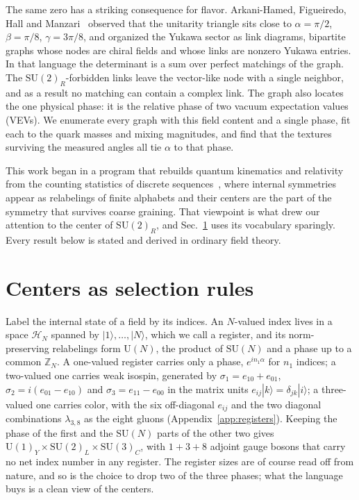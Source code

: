\documentclass[submission, Phys]{SciPost}
\newcommand{\SU}{\mathrm{SU}}
\newcommand{\U}{\mathrm{U}}
\newcommand{\Z}{\mathbb{Z}}
\newcommand{\ket}[1]{|#1\rangle}
\begin{document}
The same zero has a striking consequence for flavor. Arkani-Hamed,
Figueiredo, Hall and Manzari~\cite{Arkani-Hamed:2026uos} observed that
the unitarity triangle sits close to $\alpha=\pi/2$, $\beta=\pi/8$,
$\gamma=3\pi/8$, and organized the Yukawa
sector as link diagrams, bipartite graphs whose nodes are chiral fields
and whose links are nonzero Yukawa entries. In that language the
determinant is a sum over perfect matchings of the graph. The
$\SU(2)_R$-forbidden links leave the vector-like node with a single
neighbor, and as a result no matching can contain a complex link. The
graph also locates the one physical phase: it is the relative phase of
two vacuum expectation values (VEVs). We enumerate every graph with
this field content and a single phase, fit each to the quark masses and
mixing magnitudes, and find that the textures surviving the measured
angles all tie $\alpha$ to that phase.

This work began in a program that rebuilds quantum kinematics and
relativity from the counting statistics of discrete
sequences~\cite{Powers:2021rfg,Powers:2023ydg,PowersThesis2023,Powers:2023sqf,Berglund:2022kew,QHO,Powers:2026gbt},
where internal symmetries appear as relabelings of finite alphabets and
their centers are the part of the symmetry that survives coarse
graining. That viewpoint is what drew our attention to the center of
$\SU(2)_R$, and Sec.~\ref{sec:prelim} uses its vocabulary sparingly.
Every result below is stated and derived in ordinary field theory.

\section{Centers as selection rules}
\label{sec:prelim}

Label the internal state of a field by its indices. An $N$-valued index
lives in a space $\mathcal H_N$ spanned by $\ket1,\dots,\ket N$, which we
call a register, and its norm-preserving relabelings form $\U(N)$, the
product of $\SU(N)$ and a phase up to a common $\Z_N$. A one-valued register carries
only a phase, $e^{in_1\alpha}$ for $n_1$ indices; a two-valued one
carries weak isospin, generated by $\sigma_1=e_{10}+e_{01}$,
$\sigma_2=i(e_{01}-e_{10})$ and $\sigma_3=e_{11}-e_{00}$ in the matrix
units $e_{ij}\ket k=\delta_{jk}\ket i$; a three-valued one carries
color, with the six off-diagonal $e_{ij}$ and the two diagonal
combinations $\lambda_{3,8}$ as the eight gluons
(Appendix~\ref{app:registers}). Keeping the phase of the first and the
$\SU(N)$ parts of the other two gives
$\U(1)_Y\times\SU(2)_L\times\SU(3)_C$, with $1+3+8$ adjoint gauge bosons
that carry no net index number in any register. The register sizes are
of course read off from nature, and so is the choice to drop two of the
three phases; what the language buys is a clean view of the centers.
\end{document}
